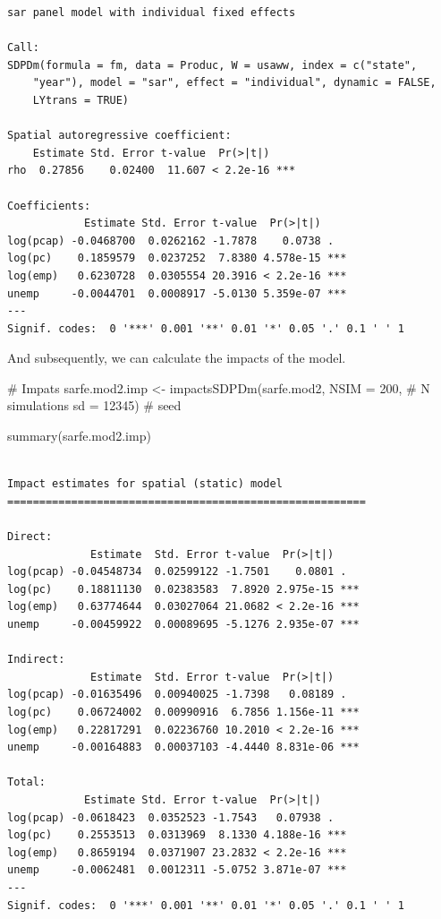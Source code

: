 \documentclass[
  letterpaper,
]{scrbook}
\newenvironment{Shaded}{\begin{snugshade}}{\end{snugshade}}
\newcommand{\AttributeTok}[1]{\textcolor[rgb]{0.40,0.45,0.13}{#1}}
\newcommand{\CommentTok}[1]{\textcolor[rgb]{0.37,0.37,0.37}{#1}}
\newcommand{\DecValTok}[1]{\textcolor[rgb]{0.68,0.00,0.00}{#1}}
\newcommand{\FunctionTok}[1]{\textcolor[rgb]{0.28,0.35,0.67}{#1}}
\newcommand{\NormalTok}[1]{\textcolor[rgb]{0.00,0.23,0.31}{#1}}
\newcommand{\OtherTok}[1]{\textcolor[rgb]{0.00,0.23,0.31}{#1}}
\begin{document}
\begin{verbatim}
sar panel model with individual fixed effects

Call:
SDPDm(formula = fm, data = Produc, W = usaww, index = c("state", 
    "year"), model = "sar", effect = "individual", dynamic = FALSE, 
    LYtrans = TRUE)

Spatial autoregressive coefficient:
    Estimate Std. Error t-value  Pr(>|t|)    
rho  0.27856    0.02400  11.607 < 2.2e-16 ***

Coefficients:
            Estimate Std. Error t-value  Pr(>|t|)    
log(pcap) -0.0468700  0.0262162 -1.7878    0.0738 .  
log(pc)    0.1859579  0.0237252  7.8380 4.578e-15 ***
log(emp)   0.6230728  0.0305554 20.3916 < 2.2e-16 ***
unemp     -0.0044701  0.0008917 -5.0130 5.359e-07 ***
---
Signif. codes:  0 '***' 0.001 '**' 0.01 '*' 0.05 '.' 0.1 ' ' 1
\end{verbatim}

And subsequently, we can calculate the impacts of the model.

\begin{Shaded}
\begin{Highlighting}[]
\CommentTok{\# Impats}
\NormalTok{sarfe.mod2.imp }\OtherTok{\textless{}{-}} \FunctionTok{impactsSDPDm}\NormalTok{(sarfe.mod2, }
                               \AttributeTok{NSIM =} \DecValTok{200}\NormalTok{, }\CommentTok{\# N simulations}
                               \AttributeTok{sd =} \DecValTok{12345}\NormalTok{) }\CommentTok{\# seed}

\FunctionTok{summary}\NormalTok{(sarfe.mod2.imp)}
\end{Highlighting}
\end{Shaded}

\begin{verbatim}

Impact estimates for spatial (static) model
========================================================

Direct:
             Estimate  Std. Error t-value  Pr(>|t|)    
log(pcap) -0.04548734  0.02599122 -1.7501    0.0801 .  
log(pc)    0.18811130  0.02383583  7.8920 2.975e-15 ***
log(emp)   0.63774644  0.03027064 21.0682 < 2.2e-16 ***
unemp     -0.00459922  0.00089695 -5.1276 2.935e-07 ***

Indirect:
             Estimate  Std. Error t-value  Pr(>|t|)    
log(pcap) -0.01635496  0.00940025 -1.7398   0.08189 .  
log(pc)    0.06724002  0.00990916  6.7856 1.156e-11 ***
log(emp)   0.22817291  0.02236760 10.2010 < 2.2e-16 ***
unemp     -0.00164883  0.00037103 -4.4440 8.831e-06 ***

Total:
            Estimate Std. Error t-value  Pr(>|t|)    
log(pcap) -0.0618423  0.0352523 -1.7543   0.07938 .  
log(pc)    0.2553513  0.0313969  8.1330 4.188e-16 ***
log(emp)   0.8659194  0.0371907 23.2832 < 2.2e-16 ***
unemp     -0.0062481  0.0012311 -5.0752 3.871e-07 ***
---
Signif. codes:  0 '***' 0.001 '**' 0.01 '*' 0.05 '.' 0.1 ' ' 1
\end{verbatim}
\end{document}
